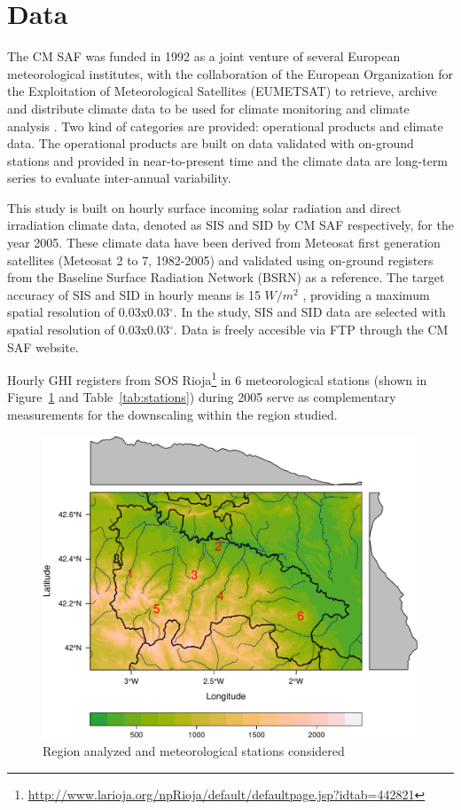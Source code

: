 \documentclass[article]{jss}
\begin{document}
\section{Data}

The CM SAF was funded in 1992 as a joint venture of several
European meteorological institutes, with the collaboration of the
European Organization for the Exploitation of Meteorological
Satellites (EUMETSAT) to retrieve, archive and distribute climate
data to be used for climate monitoring and climate analysis
\citep{Posselt.Mueller.ea2012a}. Two kind of categories
are provided: operational products and climate data. The
operational products are built on data validated with on-ground
stations and provided in near-to-present time and the climate data
are long-term series to evaluate inter-annual variability.

This study is built on hourly surface incoming solar radiation and
direct irradiation climate data, denoted as SIS and SID by CM SAF
respectively, for the year 2005. These climate data have been
derived from Meteosat first generation satellites (Meteosat 2 to
7, 1982-2005) and validated using on-ground registers from the
Baseline Surface Radiation Network (BSRN) as a reference. The
target accuracy of SIS and SID in hourly means is 15 $W/m^{2}$
\citep{Posselt.Muller.ea2011}, providing a maximum spatial resolution of
0.03x0.03$^\circ$. In the study, SIS and SID data are selected with
spatial resolution of 0.03x0.03$^\circ$. Data is freely accesible via
FTP through the CM SAF website.

Hourly GHI registers from SOS
Rioja\footnote{\url{http://www.larioja.org/npRioja/default/defaultpage.jsp?idtab=442821}}
in 6 meteorological stations (shown in
Figure~\ref{fig:mapstations} and Table~\ref{tab:stations}) during
2005 serve as complementary measurements for the downscaling
within the region studied.

\begin{figure}[H]
  \centering
  \includegraphics[width=\textwidth]{figs/mapstations.pdf}
  \caption{Region analyzed and meteorological stations considered}
  \label{fig:mapstations}
\end{figure}
\end{document}
